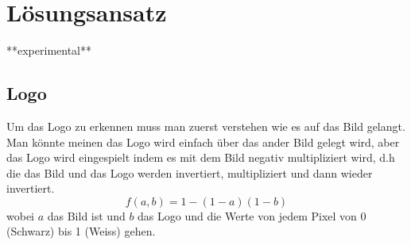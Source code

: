\documentclass[12pt,a4paper]{report}
\begin{document}
\chapter{Lösungsansatz}
\label{ch:lösungsansatz}
**experimental**
\section{Logo}
Um das Logo zu erkennen muss man zuerst verstehen wie es auf das Bild gelangt.
Man könnte meinen das Logo wird einfach über das ander Bild gelegt wird,
aber das Logo wird eingespielt indem es mit dem Bild negativ multipliziert wird,
d.h die das Bild und das Logo werden invertiert, multipliziert und dann wieder invertiert.\cite{wiki:blend}
\[f(a,b) = 1 - (1-a)(1-b)\]
wobei $a$ das Bild ist und $b$ das Logo und die Werte von jedem Pixel von 0 (Schwarz) bis 1 (Weiss) gehen.
\end{document}
